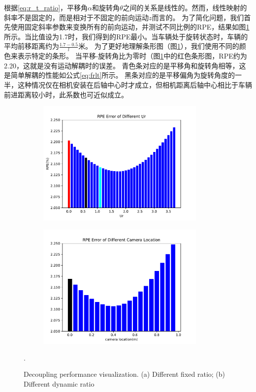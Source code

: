 根据\eqref{eq:r_t_ratio}，平移角$\alpha$和旋转角$\theta$之间的关系是线性的。然而，线性映射的斜率不是固定的，而是相对于不固定的前向运动$z$而言的。
为了简化问题，我们首先使用固定斜率参数来变换所有的前向运动，并测试不同比例的RPE，结果如图\ref{fig:static_decouple}所示。当比值设为1.7时，我们得到的RPE最小。当车辆处于旋转状态时，车辆的平均前移距离约为$\frac{1.7-0.5}{l}$米。
为了更好地理解条形图（图\ref{fig:static_decouple}），我们使用不同的颜色来表示特定的条形。
当平移-旋转角比为零时（图\ref{fig:static_decouple}中的红色条形图，RPE约为2.20，这就是没有运动解耦时的误差。
青色条对应的是平移角和旋转角相等，这是简单解耦的性能如公式\ref{eq:frlt}所示。
黑条对应的是平移偏角为旋转角度的一半，这种情况仅在相机安装在后轴中心时才成立，但相机距离后轴中心相比于车辆前进距离较小时，此系数也可近似成立\cite{scaramuzza2009real}。
\begin{figure}[ht]
    \centering
    \begin{subfigure}[b]{0.45\textwidth}
        \centering
        \includegraphics[width=0.9\textwidth]{datavo/r_t_ratio.pdf}
        \caption{}
        \label{fig:static_decouple}
    \end{subfigure}
    \begin{subfigure}[b]{0.45\textwidth}
        \centering
        \includegraphics[width=0.9\textwidth]{datavo/r_t_ratio_2.pdf}
        \caption{}
        \label{fig:dynamic_decouple}
    \end{subfigure}
    \caption{Decoupling performance {visualization}. (a) Different fixed ratio; (b) Different dynamic ratio}.
    \label{fig:r_t_ratio}
\end{figure}


